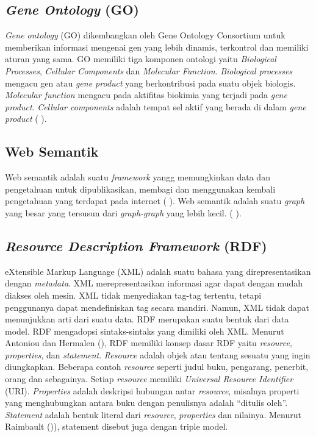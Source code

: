\subsection*{\textit{Gene Ontology} (GO)}

\textit{Gene ontology} (GO) dikembangkan oleh Gene Ontology Consortium untuk memberikan informasi mengenai gen yang lebih dinamis, terkontrol dan memiliki aturan yang sama. GO memiliki tiga komponen ontologi yaitu \textit{Biological Processes}, \textit{Cellular Components} dan \textit{Molecular Function}.  \textit{Biological processes}  mengacu gen atau \textit{gene product} yang berkontribusi pada suatu objek biologis. \textit{Molecular function} mengacu pada aktifitas biokimia yang terjadi pada \textit{gene product}. \textit{Cellular components} adalah tempat sel aktif yang berada di dalam \textit{gene product} (\citeauthor{ASHBURNERM2000} \cite*{ASHBURNERM2000}).

\subsection*{Web Semantik}

Web semantik adalah suatu \textit{framework} yangg memungkinkan data dan pengetahuan untuk dipublikasikan, membagi dan menggunakan kembali pengetahuan yang terdapat pada internet (\citeauthor{DINGL2005} \cite*{DINGL2005}). Web semantik adalah suatu \textit{graph} yang besar yang tersusun dari \textit{graph-graph} yang lebih kecil. (\citeauthor{SEGARAB2009} \cite*{SEGARAB2009}).

\subsection*{\textit{Resource Description Framework} (RDF)}

eXtensible Markup Language (XML) adalah suatu bahasa yang direpresentasikan dengan \textit{metadata}. XML merepresentasikan informasi agar dapat dengan mudah diakses oleh mesin. XML tidak menyediakan tag-tag tertentu, tetapi penggunanya dapat mendefiniskan tag secara mandiri. Namun, XML tidak dapat menunjukkan arti dari suatu data. RDF merupakan suatu bentuk dari data model. RDF mengadopsi sintaks-sintaks yang dimiliki oleh XML. Menurut Antoniou dan Hermalen (\cite*{ANTONIOUG2008}), RDF memiliki konsep dasar RDF yaitu \textit{resource}, \textit{properties}, dan \textit{statement}. \textit{Resource} adalah objek atau tentang sesuatu yang ingin diungkapkan. Beberapa contoh \textit{resource} seperti judul buku, pengarang, penerbit, orang dan sebagainya. Setiap \textit{resource} memiliki \textit{Universal Resource
Identifier} (URI). \textit{Properties} adalah deskripsi hubungan antar \textit{resource}, misalnya properti yang menghubungkan antara buku dengan penulisnya adalah “ditulis oleh”. \textit{Statement} adalah bentuk literal dari \textit{resource}, \textit{properties} dan nilainya. Menurut Raimbault (\cite*{RAIMBAULT2010})), statement disebut juga dengan triple model.

